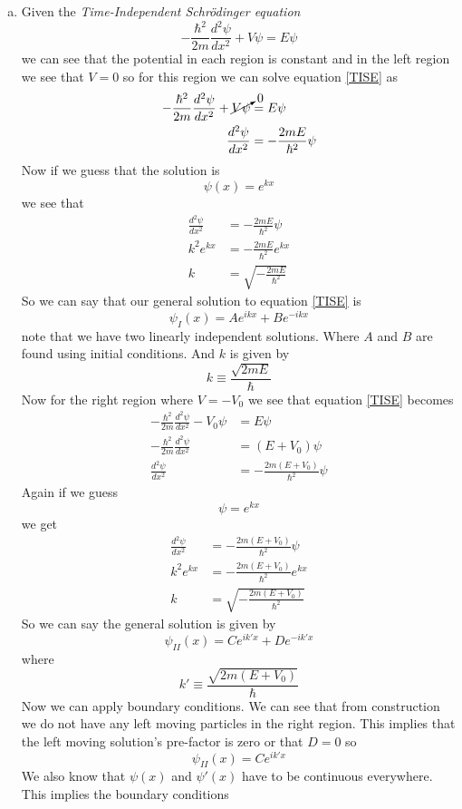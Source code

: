 \documentclass[11pt]{article}
\numberwithin{equation}{section}
\begin{document}
\begin{enumerate}[(a)]
\item
Given the \emph{Time-Independent Schr\"{o}dinger equation}
\begin{equation}
-\frac{\hbar^2}{2m}\frac{d^2\psi}{dx^2}+V\psi = E\psi 
\label{TISE}
\end{equation}
we can see that the potential in each region is constant and in the left region we see that $V=0$ so for this region we can solve equation \ref{TISE} as
\begin{align*}
-\frac{\hbar^2}{2m}\frac{d^2\psi}{dx^2}+\cancelto{0}{V\psi} &= E\psi\\
\frac{d^2\psi}{dx^2} &= -\frac{2mE}{\hbar^2}\psi
\end{align*}
Now if we guess that the solution is
$$\psi(x) = e^{kx}$$
we see that 
\begin{align*}
\frac{d^2\psi}{dx^2} &= -\frac{2mE}{\hbar^2}\psi\\
k^2e^{kx} &= -\frac{2mE}{\hbar^2}e^{kx}\\
k &= \sqrt{-\frac{2mE}{\hbar^2}}
\end{align*}
So we can say that our general solution to equation \ref{TISE} is
$$\psi_{I}(x) = Ae^{ikx}+Be^{-ikx}$$
note that we have two linearly independent solutions. Where $A$ and $B$ are found using initial conditions. And $k$ is given by
$$k\equiv\frac{\sqrt{2mE}}{\hbar}$$
Now for the right region where $V=-V_0$ we see that equation \ref{TISE} becomes
\begin{align*}
-\frac{\hbar^2}{2m}\frac{d^2\psi}{dx^2}-V_0\psi &= E\psi\\
-\frac{\hbar^2}{2m}\frac{d^2\psi}{dx^2} &= (E+V_0)\psi\\
\frac{d^2\psi}{dx^2} &= -\frac{2m(E+V_0)}{\hbar^2}\psi
\end{align*}
Again if we guess 
$$\psi = e^{kx}$$
we get
\begin{align*}
\frac{d^2\psi}{dx^2} &= -\frac{2m(E+V_0)}{\hbar^2}\psi\\
k^2e^{kx} &= -\frac{2m(E+V_0)}{\hbar^2}e^{kx}\\
k &= \sqrt{-\frac{2m(E+V_0)}{\hbar^2}}
\end{align*}
So we can say the general solution is given by
$$\psi_{II}(x) = Ce^{ik'x}+De^{-ik'x}$$
where 
$$k'\equiv\frac{\sqrt{2m(E+V_0)}}{\hbar}$$
Now we can apply boundary conditions. We can see that from construction we do not have any left moving particles in the right region. This implies that the left moving solution's pre-factor is zero or that $D=0$ so 
$$\psi_{II}(x) = Ce^{ik'x}$$ 
We also know that $\psi(x)$ and $\psi'(x)$ have to be continuous everywhere. This implies the boundary conditions

\end{enumerate}
\end{document}
